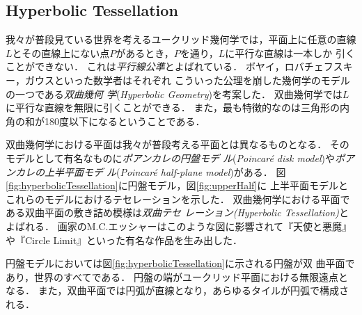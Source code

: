 \subsection{Hyperbolic Tessellation}

我々が普段見ている世界を考えるユークリッド幾何学では，平面上に任意の直線
$L$とその直線上にない点$P$があるとき，$P$を通り，$L$に平行な直線は一本しか
引くことができない．
これは\emph{平行線公準}とよばれている．
ボヤイ，ロバチェフスキー，ガウスといった数学者はそれぞれ
こういった公理を崩した幾何学のモデルの一つである\emph{双曲幾何
学}(\textit{Hyperbolic Geometry})を考案した．
双曲幾何学では$L$に平行な直線を無限に引くことができる．
また，最も特徴的なのは三角形の内角の和が180度以下になるということである．

双曲幾何学における平面は我々が普段考える平面とは異なるものとなる．
そのモデルとして有名なものに\emph{ポアンカレの円盤モデ
ル}(\textit{Poincar\'e disk model})や\emph{ポアンカレの上半平面モデ
ル}(\textit{Poincar\'e half-plane model})がある．
図\ref{fig:hyperbolicTessellation}に円盤モデル，図\ref{fig:upperHalf}に
上半平面モデルとこれらのモデルにおけるテセレーションを示した．
双曲幾何学における平面である双曲平面の敷き詰め模様は\emph{双曲テセ
レーション}{\it (Hyperbolic Tessellation)}とよばれる．
画家のM.C.エッシャーはこのような図に影響されて『天使と悪魔』や『Circle
Limit』といった有名な作品を生み出した．

円盤モデルにおいては図\ref{fig:hyperbolicTessellation}に示される円盤が双
曲平面であり，世界のすべてである．
円盤の端がユークリッド平面における無限遠点となる．
また，双曲平面では円弧が直線となり，あらゆるタイルが円弧で構成される．

